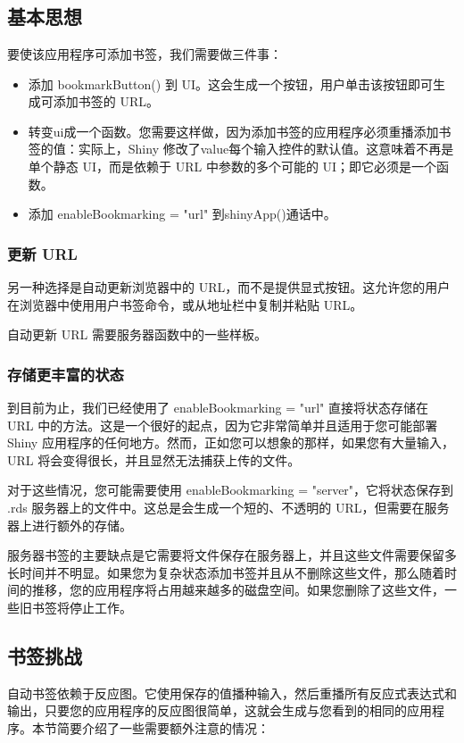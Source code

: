 \chapter{\label{ch11}}
\section{基本思想}
要使该应用程序可添加书签，我们需要做三件事：
\begin{itemize}
    \item 添加 bookmarkButton() 到 UI。这会生成一个按钮，用户单击该按钮即可生成可添加书签的 URL。
    \item 转变ui成一个函数。您需要这样做，因为添加书签的应用程序必须重播添加书签的值：实际上，Shiny 修改了value每个输入控件的默认值。这意味着不再是单个静态 UI，而是依赖于 URL 中参数的多个可能的 UI；即它必须是一个函数。
    \item 添加 enableBookmarking = "url" 到shinyApp()通话中。
\end{itemize}
\subsection{更新 URL}
另一种选择是自动更新浏览器中的 URL，而不是提供显式按钮。这允许您的用户在浏览器中使用用户书签命令，或从地址栏中复制并粘贴 URL。

自动更新 URL 需要服务器函数中的一些样板。
\subsection{存储更丰富的状态}
到目前为止，我们已经使用了 enableBookmarking = "url" 直接将状态存储在 URL 中的方法。这是一个很好的起点，因为它非常简单并且适用于您可能部署 Shiny 应用程序的任何地方。然而，正如您可以想象的那样，如果您有大量输入，URL 将会变得很长，并且显然无法捕获上传的文件。

对于这些情况，您可能需要使用 enableBookmarking = "server"，它将状态保存到 .rds 服务器上的文件中。这总是会生成一个短的、不透明的 URL，但需要在服务器上进行额外的存储。

服务器书签的主要缺点是它需要将文件保存在服务器上，并且这些文件需要保留多长时间并不明显。如果您为复杂状态添加书签并且从不删除这些文件，那么随着时间的推移，您的应用程序将占用越来越多的磁盘空间。如果您删除了这些文件，一些旧书签将停止工作。

\section{书签挑战}
自动书签依赖于反应图。它使用保存的值播种输入，然后重播所有反应式表达式和输出，只要您的应用程序的反应图很简单，这就会生成与您看到的相同的应用程序。本节简要介绍了一些需要额外注意的情况：

